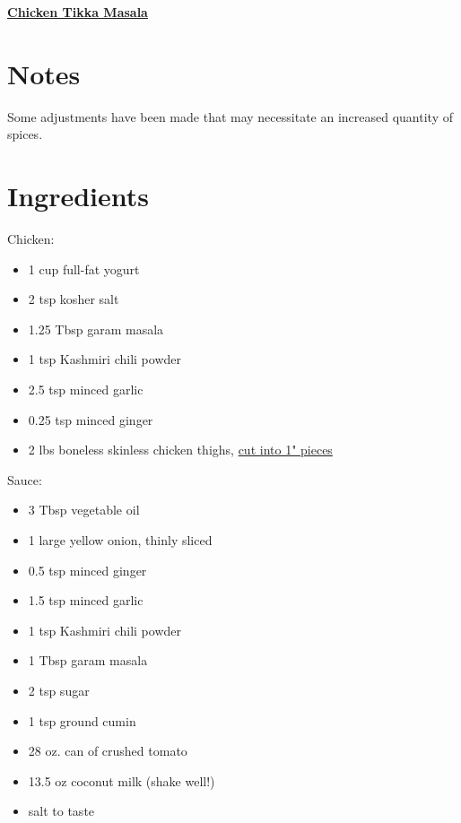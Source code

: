 \documentclass[11pt]{article}
\begin{document}
    \begin{center}\begin{huge}\underline{\textbf{Chicken Tikka Masala}}\end{huge}\end{center}

    \section*{Notes}
    Some adjustments have been made that may necessitate an increased quantity of spices.

    \section*{Ingredients}
    Chicken:\vspace*{-1.5ex}
    \begin{itemize}%
        \item 1 cup full-fat yogurt
        \item 2 tsp kosher salt
        \item 1.25 Tbsp garam masala
        \item 1 tsp Kashmiri chili powder
        \item 2.5 tsp minced garlic
        \item 0.25 tsp minced ginger
        \item 2 lbs boneless skinless chicken thighs, \underline{cut into 1" pieces}
    \end{itemize}

    Sauce:\vspace*{-1.5ex}
    \begin{itemize}
        \item 3 Tbsp vegetable oil
        \item 1 large yellow onion, thinly sliced
        \item 0.5 tsp minced ginger
        \item 1.5 tsp minced garlic
        \item 1 tsp Kashmiri chili powder
        \item 1 Tbsp garam masala
        \item 2 tsp sugar
        \item 1 tsp ground cumin
        \item 28 oz. can of crushed tomato
        \item 13.5 oz coconut milk (shake well!)
        \item salt to taste
    \end{itemize}
\end{document}
